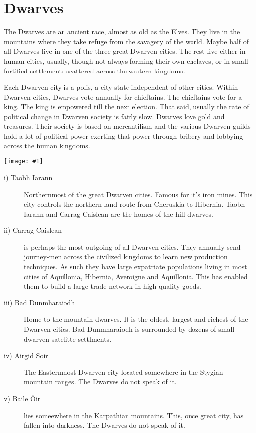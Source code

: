 \documentclass[a4paper]{dnd5}
\newcommand\inc[1]{
 \begin{center}\texttt{[image: \#1]}\end{center}
}
\begin{document}
\pagestyle{empty}

\section*{Dwarves}

The Dwarves are an ancient race, almost as old as the Elves.  They live in the mountains where they take refuge from the savagery of the world.  Maybe half of all Dwarves live in one of the three great Dwarven cities.  The rest live either in human cities, usually, though not always forming their own enclaves, or in small fortified settlements scattered across the western kingdoms.

Each Dwarven city is a polis, a city-state independent of other cities.  Within Dwarven cities, Dwarves vote annually for chieftains.  The chieftains vote for a king.  The king is empowered till the next election.  That said, usually the rate of political change in Dwarven society is fairly slow.  Dwarves love gold and treasures.  Their society is based on mercantilism and the various Dwarven guilds hold a lot of political power exerting that power through bribery and lobbying across the human kingdoms.  

\inc{dwarf.jpg}



\begin{description}
\item[i) Taobh Iarann] Northernmost of the great Dwarven cities.  Famous for it's iron mines.  This city controls the northern land route from Cheruskia to Hibernia.  Taobh Iarann and Carrag Caislean are the homes of the hill dwarves.
\item[ii) Carrag Caislean] is perhaps the most outgoing of all Dwarven cities.  They annually send journey-men across the civilized kingdoms to learn new production techniques.  As such they have large expatriate populations living in most cities of Aquillonia, Hibernia, Averoigne and Aquillonia.  This has enabled them to build a large trade network in high quality goods.
\item[iii) Bad Dunmharaiodh] Home to the mountain dwarves.  It is the oldest, largest and richest of the Dwarven cities.  Bad Dunmharaiodh is surrounded by dozens of small dwarven satelitte settlments.  
\item[iv) Airgid Soir] The Easternmost Dwarven city located somewhere in the Stygian mountain ranges.  The Dwarves do not speak of it.
\item[v) Baile Óir] lies someewhere in the Karpathian mountains.  This, once great city, has fallen into darkness. The Dwarves do not speak of it.
\end{description}
\end{document}
